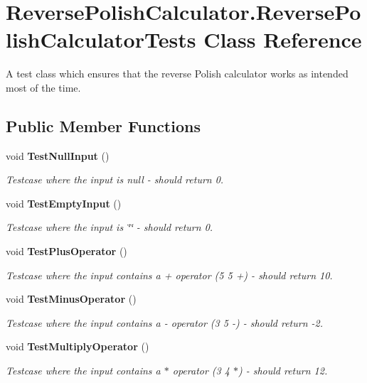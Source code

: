 \section{Reverse\+Polish\+Calculator.\+Reverse\+Polish\+Calculator\+Tests Class Reference}
\label{class_reverse_polish_calculator_1_1_reverse_polish_calculator_tests}


A test class which ensures that the reverse Polish calculator works as intended most of the time.  


\subsection*{Public Member Functions}
\begin{DoxyCompactItemize}
\item 
void {\bf Test\+Null\+Input} ()
\begin{DoxyCompactList}\small\item\em Testcase where the input is null -\/ should return 0. \end{DoxyCompactList}\item 
void {\bf Test\+Empty\+Input} ()
\begin{DoxyCompactList}\small\item\em Testcase where the input is \char`\"{}\char`\"{} -\/ should return 0. \end{DoxyCompactList}\item 
void {\bf Test\+Plus\+Operator} ()
\begin{DoxyCompactList}\small\item\em Testcase where the input contains a + operator (5 5 +) -\/ should return 10. \end{DoxyCompactList}\item 
void {\bf Test\+Minus\+Operator} ()
\begin{DoxyCompactList}\small\item\em Testcase where the input contains a -\/ operator (3 5 -\/) -\/ should return -\/2. \end{DoxyCompactList}\item 
void {\bf Test\+Multiply\+Operator} ()
\begin{DoxyCompactList}\small\item\em Testcase where the input contains a $\ast$ operator (3 4 $\ast$) -\/ should return 12. \end{DoxyCompactList}\item 

\end{DoxyCompactItemize}
